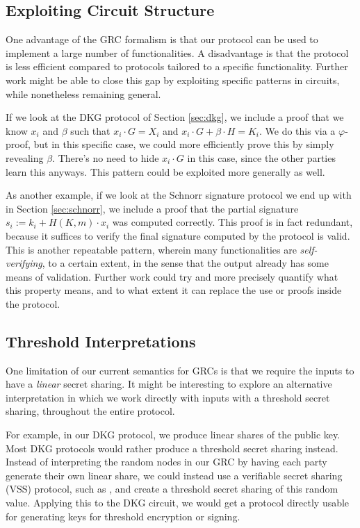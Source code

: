 \subsection{Exploiting Circuit Structure}

One advantage of the GRC formalism is that our protocol
can be used to implement a large number of functionalities.
A disadvantage is that the protocol is less efficient compared
to protocols tailored to a specific functionality.
Further work might be able to close this gap by exploiting
specific patterns in circuits, while nonetheless
remaining general.

If we look at the DKG protocol of Section \ref{sec:dkg},
we include a proof that we know $x_i$ and $\beta$ such that
$x_i \cdot G = X_i$ and $x_i \cdot G + \beta \cdot H = K_i$.
We do this via a $\varphi$-proof, but in this specific case,
we could more efficiently prove this by simply revealing $\beta$.
There's no need to hide $x_i \cdot G$ in this case, since the
other parties learn this anyways.
This pattern could be exploited more generally as well.

As another example, if we look at the Schnorr signature
protocol we end up with in Section \ref{sec:schnorr},
we include a proof that the partial signature $s_i := k_i + H(K, m) \cdot x_i$
was computed correctly.
This proof is in fact redundant, because it suffices to verify
the final signature computed by the protocol is valid.
This is another repeatable pattern, wherein many functionalities
are \emph{self-verifying}, to a certain extent,
in the sense that the output already has some means of validation.
Further work could try and more precisely quantify what
this property means, and to what extent it can replace the use
or proofs inside the protocol.

\subsection{Threshold Interpretations}

One limitation of our current semantics for GRCs is that we require
the inputs to have a \emph{linear} secret sharing.
It might be interesting to explore an alternative interpretation
in which we work directly with inputs with a threshold secret sharing,
throughout the entire protocol.

For example, in our DKG protocol, we produce linear shares
of the public key.
Most DKG protocols would rather produce a threshold secret sharing
instead.
Instead of interpreting the random nodes in our GRC
by having each party generate their own linear share, we could
instead use a verifiable secret sharing (VSS) protocol,
such as \cite{feldman_practical_1987}, and create a threshold
secret sharing of this random value.
Applying this to the DKG circuit, we would get a protocol
directly usable for generating keys for threshold encryption
or signing.

